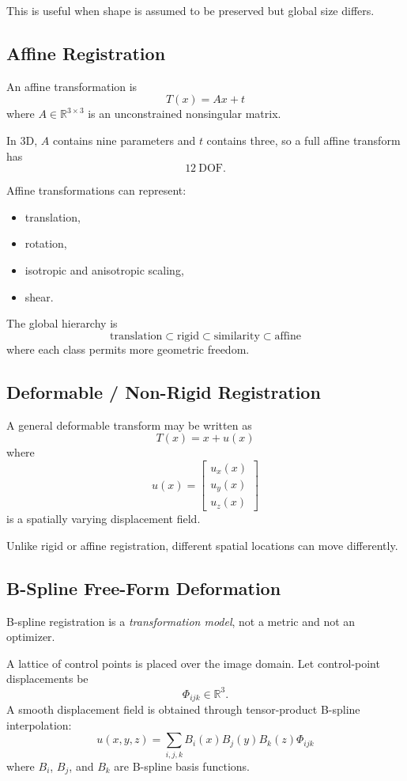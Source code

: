 \documentclass[11pt,a4paper]{article}
\newcommand{\R}{\mathbb{R}}
\begin{document}
This is useful when shape is assumed to be preserved but global size differs.

\subsection{Affine Registration}

An affine transformation is
\[
\boxed{T(x)=Ax+t}
\]
where $A\in\R^{3\times3}$ is an unconstrained nonsingular matrix.

In 3D, $A$ contains nine parameters and $t$ contains three, so a full affine transform has
\[
\boxed{12\ \text{DOF}}.
\]

Affine transformations can represent:
\begin{itemize}
  \item translation,
  \item rotation,
  \item isotropic and anisotropic scaling,
  \item shear.
\end{itemize}

The global hierarchy is
\[
\boxed{
\text{translation}
\subset
\text{rigid}
\subset
\text{similarity}
\subset
\text{affine}
}
\]
where each class permits more geometric freedom.

\subsection{Deformable / Non-Rigid Registration}

A general deformable transform may be written as
\[
\boxed{T(x)=x+u(x)}
\]
where
\[
u(x)=
\begin{bmatrix}
 u_x(x)\\u_y(x)\\u_z(x)
\end{bmatrix}
\]
is a spatially varying displacement field.

Unlike rigid or affine registration, different spatial locations can move differently.

\subsection{B-Spline Free-Form Deformation}

B-spline registration is a \emph{transformation model}, not a metric and not an optimizer.

A lattice of control points is placed over the image domain. Let control-point displacements be
\[
\Phi_{ijk}\in\R^3.
\]
A smooth displacement field is obtained through tensor-product B-spline interpolation:
\[
\boxed{
u(x,y,z)
=
\sum_{i,j,k}
B_i(x)B_j(y)B_k(z)\Phi_{ijk}
}
\]
where $B_i$, $B_j$, and $B_k$ are B-spline basis functions.
\end{document}
